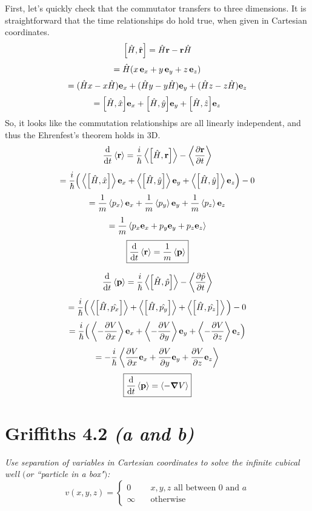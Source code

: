\documentclass[12pt]{article}
\begin{document}
\begin{enumerate}[label=\alph*)]
First, let's quickly check that the commutator transfers to three dimensions. It is straightforward that the time relationships do hold true, when given in Cartesian coordinates.
\[\comm{\hat{H}}{\hat{\vb{r}}} = \hat{H}\vb{r} - \vb{r}\hat{H}\]
\[ = \hat{H}(x\, \vb{e}_x + y\, \vb{e}_y + z\, \vb{e}_z)\]
\[= (\hat{H}x - x\hat{H})\vb{e}_x + (\hat{H}y - y\hat{H})\vb{e}_y + (\hat{H}z - z\hat{H})\vb{e}_z \]
\[= \comm{\hat{H}}{\hat{x}}\vb{e}_x + \comm{\hat{H}}{\hat{y}}\vb{e}_y + \comm{\hat{H}}{\hat{z}}\vb{e}_z\]
So, it looks like the commutation relationships are all linearly independent, and thus the Ehrenfest's theorem holds in 3D. 
\[\dv{t}\ev{\vb{r}} = \frac{i}{\hbar} \ev{\comm{\hat{H}}{\vb{r}}} - \ev{\pdv{\vb{r}}{t}}\]
\[= \frac{i}{\hbar}\Big(\ev{\comm{\hat{H}}{\hat{x}}}\vb{e}_x + \ev{\comm{\hat{H}}{\hat{y}}}\vb{e}_y + \ev{\comm{\hat{H}}{\hat{y}}}\vb{e}_z\Big) - 0\]
\[= \frac{1}{m}\ev{p_x}\vb{e}_x + \frac{1}{m}\ev{p_y}\vb{e}_y + \frac{1}{m}\ev{p_z}\vb{e}_z\]
\[= \frac{1}{m}\ev{p_x\vb{e}_x + p_y\vb{e}_y + p_z\vb{e}_z}\]
\[\boxed{\dv{t}\ev{\vb{r}} = \frac{1}{m}\ev{\vb{p}}}\]

\[\dv{t}\ev{\vb{p}} = \frac{i}{\hbar} \ev{\comm{\hat{H}}{\hat{p}}} - \ev{\pdv{\hat{p}}{t}}\]
\[ = \frac{i}{\hbar} \Big(\ev{\comm{\hat{H}}{\hat{p_x}}} + \ev{\comm{\hat{H}}{\hat{p_y}}} + \ev{\comm{\hat{H}}{\hat{p_z}}}\Big) - 0\]
\[= \frac{i}{\hbar}\Big(\ev{-\pdv{V}{x}}\vb{e}_x + \ev{-\pdv{V}{y}}\vb{e}_y + \ev{-\pdv{V}{z}}\vb{e}_z\Big)\]
\[= -\frac{i}{\hbar} \ev{\pdv{V}{x}\vb{e}_x + \pdv{V}{y}\vb{e}_y + \pdv{V}{z}\vb{e}_z}\]
\[\boxed{\dv{t}\ev{\vb{p}} = \ev{-\grad{V}}}\]
\end{enumerate}

\newpage

\section*{Griffiths 4.2 \emph{(a and b)}}
\emph{Use separation of variables in Cartesian coordinates to solve the infinite cubical well $($or ``particle in a box"$)$:}
\begin{equation*}
v(x,y,z) = \left\{
        \begin{array}{ll}
            0 & \quad x,y,z \text{ all between } 0 \text{ and } a \\
            \infty & \quad \text{otherwise}
        \end{array}
    \right.
\end{equation*}
\end{document}
